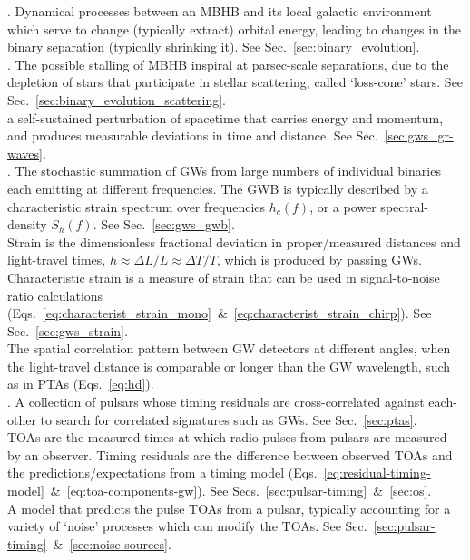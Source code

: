 \documentclass[onecolumn,authoryear]{els-mrw}
\begin{document}
\begin{glossary}[Glossary]
    .  Dynamical processes between an MBHB and its local galactic environment which serve to change (typically extract) orbital energy, leading to changes in the binary separation (typically shrinking it).  See Sec.~\ref{sec:binary_evolution}. \\
    .  The possible stalling of MBHB inspiral at parsec-scale separations, due to the depletion of stars that participate in stellar scattering, called `loss-cone' stars.  See Sec.~\ref{sec:binary_evolution_scattering}. \\
     a self-sustained perturbation of spacetime that carries energy and momentum, and produces measurable deviations in time and distance.  See Sec.~\ref{sec:gws_gr-waves}. \\
    .  The stochastic summation of GWs from large numbers of individual binaries each emitting at different frequencies.  The GWB is typically described by a characteristic strain spectrum over frequencies $h_c(f)$, or a power spectral-density $S_h(f)$.  See Sec.~\ref{sec:gws_gwb}. \\
     Strain is the dimensionless fractional deviation in proper/measured distances and light-travel times, $h \approx \Delta L / L \approx \Delta T / T$, which is produced by passing GWs.  Characteristic strain is a measure of strain that can be used in signal-to-noise ratio calculations (Eqs.~\ref{eq:characterist_strain_mono}~\&~\ref{eq:characterist_strain_chirp}).  See Sec.~\ref{sec:gws_strain}. \\
      The spatial correlation pattern between GW detectors at different angles, when the light-travel distance is comparable or longer than the GW wavelength, such as in PTAs (Eqs.~\ref{eq:hd}). \\
    . A collection of pulsars whose timing residuals are cross-correlated against each-other to search for correlated signatures such as GWs.  See Sec.~\ref{sec:ptas}. \\
      TOAs are the measured times at which radio pulses from pulsars are measured by an observer.  Timing residuals are the difference between observed TOAs and the predictions/expectations from a timing model (Eqs.~\ref{eq:residual-timing-model}~\&~\ref{eq:toa-components-gw}).  See Secs.~\ref{sec:pulsar-timing}~\&~\ref{sec:os}. \\
     A model that predicts the pulse TOAs from a pulsar, typically accounting for a variety of `noise' processes which can modify the TOAs.  See Sec.~\ref{sec:pulsar-timing}~\&~\ref{sec:noise-sources}.  \\
    \end{glossary}
\end{document}
